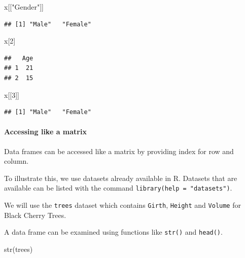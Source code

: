 \documentclass[
]{book}
\newenvironment{Shaded}{\begin{snugshade}}{\end{snugshade}}
\newcommand{\DecValTok}[1]{\textcolor[rgb]{0.00,0.00,0.81}{#1}}
\newcommand{\FunctionTok}[1]{\textcolor[rgb]{0.00,0.00,0.00}{#1}}
\newcommand{\NormalTok}[1]{#1}
\newcommand{\StringTok}[1]{\textcolor[rgb]{0.31,0.60,0.02}{#1}}
\begin{document}
\begin{Shaded}
\begin{Highlighting}[]
\NormalTok{x[[}\StringTok{"Gender"}\NormalTok{]]}
\end{Highlighting}
\end{Shaded}

\begin{verbatim}
## [1] "Male"   "Female"
\end{verbatim}

\begin{Shaded}
\begin{Highlighting}[]
\NormalTok{x[}\DecValTok{2}\NormalTok{]}
\end{Highlighting}
\end{Shaded}

\begin{verbatim}
##   Age
## 1  21
## 2  15
\end{verbatim}

\begin{Shaded}
\begin{Highlighting}[]
\NormalTok{x[[}\DecValTok{3}\NormalTok{]]}
\end{Highlighting}
\end{Shaded}

\begin{verbatim}
## [1] "Male"   "Female"
\end{verbatim}

\hypertarget{accessing-like-a-matrix}{%
\paragraph{Accessing like a matrix}\label{accessing-like-a-matrix}}

Data frames can be accessed like a matrix by providing index for row and column.

To illustrate this, we use datasets already available in R. Datasets that are available can be listed with the command \texttt{library(help\ =\ "datasets")}.

We will use the \texttt{trees} dataset which contains \texttt{Girth}, \texttt{Height} and \texttt{Volume} for Black Cherry Trees.

A data frame can be examined using functions like \texttt{str()} and \texttt{head()}.

\begin{Shaded}
\begin{Highlighting}[]
\FunctionTok{str}\NormalTok{(trees)}
\end{Highlighting}
\end{Shaded}
\end{document}
